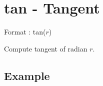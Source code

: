 %

\section{tan - Tangent\label{sect:tan}}

Format : tan($r$)

Compute tangent of radian $r$.

\subsection*{Example}


%

